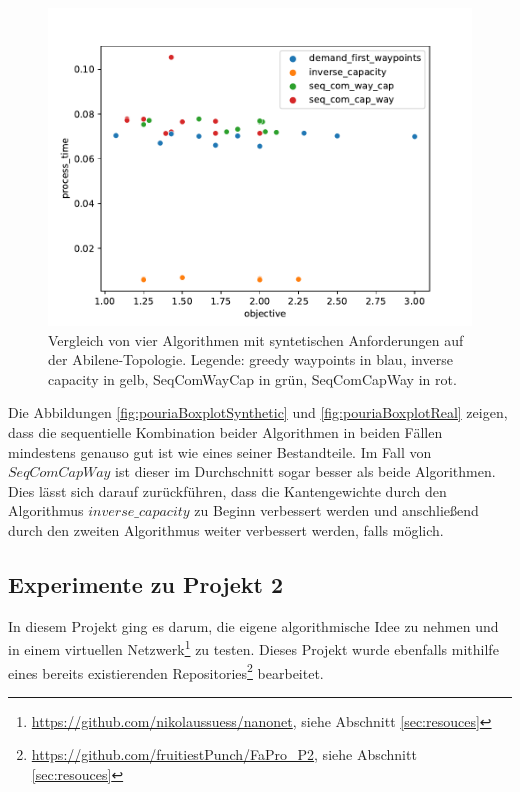 \documentclass[sigconf, nonacm, review]{acmart}
\begin{document}
\begin{figure}
\centering
\includegraphics[width=\linewidth]{figures/pouria_colored_scatter_plot_results_all_algorithms.pdf}
\caption{Vergleich von vier Algorithmen mit syntetischen Anforderungen auf der Abilene-Topologie. Legende: greedy waypoints in blau, inverse capacity in gelb, SeqComWayCap in gr\"un, SeqComCapWay in rot.}
\label{fig:pouriaScatterSynthetic}
\end{figure}
Die Abbildungen \ref{fig:pouriaBoxplotSynthetic} und \ref{fig:pouriaBoxplotReal} zeigen, 
dass die sequentielle Kombination beider Algorithmen in beiden F\"allen mindestens genauso gut ist wie eines seiner Bestandteile. 
Im Fall von $SeqComCapWay$ ist dieser im Durchschnitt sogar besser als beide Algorithmen.
Dies l\"asst sich darauf zur\"uckf\"uhren, 
dass die Kantengewichte durch den Algorithmus $inverse\_capacity$ zu Beginn verbessert werden 
und anschlie\ss end durch den zweiten Algorithmus weiter verbessert werden, falls m\"oglich.
\subsection{Experimente zu Projekt 2}
In diesem Projekt ging es darum, die eigene algorithmische Idee zu nehmen und in einem virtuellen Netzwerk\footnote{\url{https://github.com/nikolaussuess/nanonet}, siehe Abschnitt \ref{sec:resouces}} zu testen. 
Dieses Projekt wurde ebenfalls mithilfe eines bereits existierenden Repositories\footnote{\url{https://github.com/fruitiestPunch/FaPro_P2}, siehe Abschnitt \ref{sec:resouces}} bearbeitet.
\end{document}
